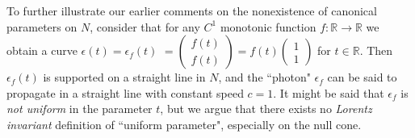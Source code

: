 \documentclass[12pt]{amsart}
\newcommand{\bR}{\mathbb{R}}
\newcommand{\del}{\partial}
\begin{document}
To further illustrate our earlier comments on the nonexistence of canonical parameters on $N$, consider that for any $C^1$ monotonic function $f: \bR \to \bR$ we obtain a curve $\epsilon(t)=\epsilon_f(t)$ $=\begin{pmatrix} f(t) \\ f(t)   \end{pmatrix}=f(t) \begin{pmatrix} 1 \\ 1 \end{pmatrix}$ for $t\in \bR$. Then $\epsilon_f(t)$ is supported on a straight line in $N$, and the ``photon" $\epsilon_f$ can be said to propagate in a straight line with constant speed $c=1$. It might be said that $\epsilon_f$ is \emph{not uniform} in the parameter $t$, but we argue that there exists no \emph{Lorentz invariant} definition of ``uniform parameter", especially on the null cone. 





\end{document}
